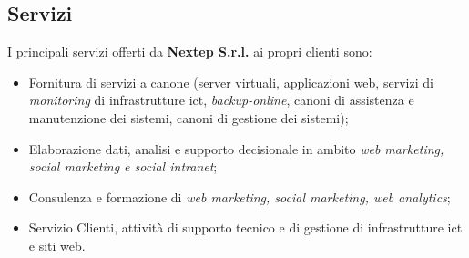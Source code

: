 \subsection{Servizi}

I principali servizi offerti da \textbf{Nextep S.r.l. }ai propri clienti sono:
\begin{itemize}
	\item Fornitura di servizi a canone (server virtuali, applicazioni web, servizi di \textit{monitoring }di infrastrutture \gls{ict}, \textit{backup-online}, canoni di assistenza e manutenzione dei sistemi, canoni di gestione dei sistemi);
	\item Elaborazione dati, analisi e supporto decisionale in ambito \textit{web marketing, social marketing e social intranet};
	\item Consulenza e formazione di \textit{web marketing, social marketing, web analytics};
	\item Servizio Clienti, attività di supporto tecnico e di gestione di infrastrutture \gls{ict} e siti web.
\end{itemize}


